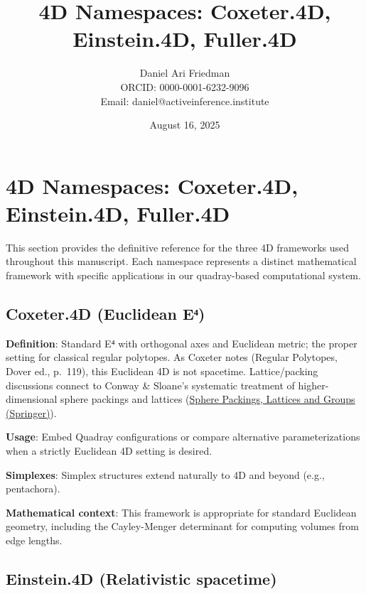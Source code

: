 \documentclass[
  10pt,
]{article}
\title{4D Namespaces: Coxeter.4D, Einstein.4D, Fuller.4D}
\author{Daniel Ari Friedman\\ ORCID: 0000-0001-6232-9096\\ Email: daniel@activeinference.institute}
\date{August 16, 2025}
\begin{document}
\maketitle

{
\hypersetup{linkcolor=black}
\setcounter{tocdepth}{3}
\tableofcontents
}
\hypertarget{d-namespaces-coxeter.4d-einstein.4d-fuller.4d}{%
\section{4D Namespaces: Coxeter.4D, Einstein.4D,
Fuller.4D}\label{d-namespaces-coxeter.4d-einstein.4d-fuller.4d}}

This section provides the definitive reference for the three 4D
frameworks used throughout this manuscript. Each namespace represents a
distinct mathematical framework with specific applications in our
quadray-based computational system.

\hypertarget{coxeter.4d-euclidean-eux2074}{%
\subsection{Coxeter.4D (Euclidean
E⁴)}\label{coxeter.4d-euclidean-eux2074}}

\textbf{Definition}: Standard E⁴ with orthogonal axes and Euclidean
metric; the proper setting for classical regular polytopes. As Coxeter
notes (Regular Polytopes, Dover ed., p.~119), this Euclidean 4D is not
spacetime. Lattice/packing discussions connect to Conway \& Sloane's
systematic treatment of higher-dimensional sphere packings and lattices
(\href{https://link.springer.com/book/10.1007/978-1-4757-6568-7}{Sphere
Packings, Lattices and Groups (Springer)}).

\textbf{Usage}: Embed Quadray configurations or compare alternative
parameterizations when a strictly Euclidean 4D setting is desired.

\textbf{Simplexes}: Simplex structures extend naturally to 4D and beyond
(e.g., pentachora).

\textbf{Mathematical context}: This framework is appropriate for
standard Euclidean geometry, including the Cayley-Menger determinant for
computing volumes from edge lengths.

\hypertarget{einstein.4d-relativistic-spacetime}{%
\subsection{Einstein.4D (Relativistic
spacetime)}\label{einstein.4d-relativistic-spacetime}}
\end{document}
